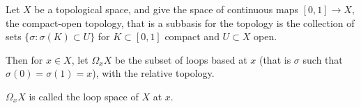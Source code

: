 \documentclass{article}
\begin{document}
Let $X$ be a topological space, and give the space of continuous maps $[0,1]\to X$, the compact-open topology, that is a subbasis for the topology is the collection of sets $\{\sigma : \sigma(K)\subset U \}$ for $K\subset [0,1]$ compact and $U\subset X$ open.

Then for $x\in X$, let $\Omega_{x}X$ be the subset of loops based at $x$ (that is $\sigma$ such that $\sigma(0) = \sigma(1) = x$), with the relative topology.

$\Omega_{x}X$ is called the loop space of $X$ at $x$.
\end{document}

